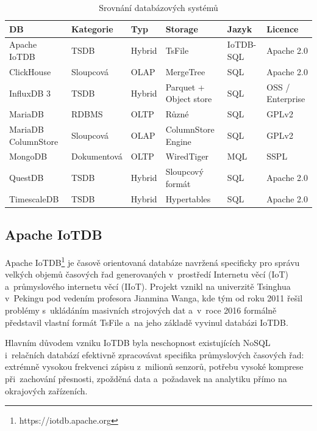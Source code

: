 \begin{table}[H]
\centering
\footnotesize
\setlength{\tabcolsep}{3pt}
\renewcommand{\arraystretch}{1.25}

\begin{tabular}{|l|l|l|l|l|l|}
\hline
\textbf{DB} & \textbf{Kategorie} & \textbf{Typ} & \textbf{Storage} & \textbf{Jazyk} & \textbf{Licence} \\
\hline
Apache IoTDB & TSDB & Hybrid& TsFile & IoTDB-SQL & Apache 2.0 \\
\hline
ClickHouse & Sloupcová & OLAP & MergeTree & SQL & Apache 2.0 \\
\hline
InfluxDB 3 & TSDB & Hybrid & Parquet + Object store & SQL & OSS / Enterprise \\
\hline
MariaDB & RDBMS & OLTP & Různé & SQL & GPLv2 \\
\hline
MariaDB ColumnStore & Sloupcová & OLAP & ColumnStore Engine & SQL & GPLv2 \\
\hline
MongoDB & Dokumentová & OLTP & WiredTiger & MQL & SSPL \\
\hline
QuestDB & TSDB & Hybrid & Sloupcový formát & SQL & Apache 2.0 \\
\hline
TimescaleDB & TSDB & Hybrid & Hypertables & SQL & Apache 2.0 \\
\hline
\end{tabular}

\caption{Srovnání databázových systémů}
\label{table:db_compact}
\end{table}

\subsection{Apache IoTDB}

Apache IoTDB\footnote{https://iotdb.apache.org} je časově orientovaná databáze navržená specificky pro správu velkých objemů časových řad generovaných v~prostředí Internetu věcí (IoT) a~průmyslového internetu věcí (IIoT). 
Projekt vznikl na univerzitě Tsinghua v~Pekingu pod vedením profesora Jianmina Wanga, kde tým od roku 2011 řešil problémy s~ukládáním masivních strojových dat a~v~roce 2016 formálně představil vlastní formát TsFile a~na jeho základě vyvinul databázi IoTDB. 
\cite{iotdbdocs}

Hlavním důvodem vzniku IoTDB byla neschopnost existujících NoSQL i~relačních databází efektivně zpracovávat specifika průmyslových časových řad: extrémně vysokou frekvenci zápisu z~milionů senzorů, potřebu vysoké komprese při~zachování přesnosti, zpožděná data a~požadavek na analytiku přímo na okrajových zařízeních. 
\cite{iotdbdocs}

